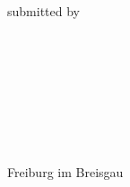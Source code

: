 \begin{titlepage}
	\begin{addmargin}[-1cm]{-3cm}
    \begin{center}
        \large  

        \hfill
        \vfill


        \begingroup
            \color{Maroon}\spacedallcaps{\myTitle} \\ \bigskip
        \endgroup

        \hfill 
        \vfill
        
        \spacedallcaps{\mySubtitle} \\ \bigskip

        \hfill \\

        submitted by \\ \bigskip
        
        \spacedallcaps{\myName} \\ \bigskip

        \hfill \\

        \myTime\ %
        \vfill

    
        \vfill
        \myProf \\ \bigskip
        \myFaculty \\ \bigskip
         \\ \bigskip
        Freiburg im Breisgau \\ \medskip


        \vfill                      

    \end{center}  
  \end{addmargin}       
\end{titlepage}   
